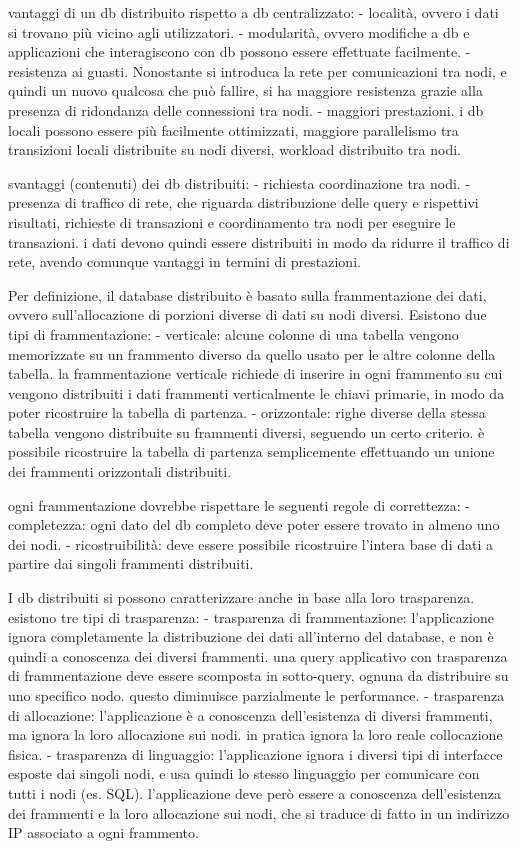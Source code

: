 vantaggi di un db distribuito rispetto a db centralizzato:
- località, ovvero i dati si trovano più vicino agli utilizzatori.
- modularità, ovvero modifiche a db e applicazioni che interagiscono con db
possono essere effettuate facilmente.
- resistenza ai guasti. Nonostante si introduca la rete per comunicazioni tra
nodi, e quindi un nuovo qualcosa che può fallire, si ha maggiore resistenza
grazie alla presenza di ridondanza delle connessioni tra nodi.
- maggiori prestazioni. i db locali possono essere più facilmente ottimizzati,
maggiore parallelismo tra transizioni locali distribuite su nodi diversi, workload
distribuito tra nodi.

svantaggi (contenuti) dei db distribuiti:
- richiesta coordinazione tra nodi.
- presenza di traffico di rete, che riguarda distribuzione delle query e
rispettivi risultati, richieste di transazioni e coordinamento tra nodi
per eseguire le transazioni. i dati devono quindi essere distribuiti in
modo da ridurre il traffico di rete, avendo comunque vantaggi in termini
di prestazioni.


Per definizione, il database distribuito è basato sulla frammentazione dei dati,
ovvero sull'allocazione di porzioni diverse di dati su nodi diversi.
Esistono due tipi di frammentazione:
- verticale: alcune colonne di una tabella vengono memorizzate su un frammento
diverso da quello usato per le altre colonne della tabella.
la frammentazione verticale richiede di inserire in ogni frammento su cui
vengono distribuiti i dati frammenti verticalmente le chiavi primarie, in modo
da poter ricostruire la tabella di partenza.
- orizzontale: righe diverse della stessa tabella vengono distribuite
su frammenti diversi, seguendo un certo criterio. è possibile ricostruire la
tabella di partenza semplicemente effettuando un unione dei frammenti orizzontali
distribuiti.

ogni frammentazione dovrebbe rispettare le seguenti regole di correttezza:
- completezza: ogni dato del db completo deve poter essere trovato in almeno
uno dei nodi.
- ricostruibilità: deve essere possibile ricostruire l'intera base di dati
a partire dai singoli frammenti distribuiti.


I db distribuiti si possono caratterizzare anche in base alla loro trasparenza.
esistono tre tipi di trasparenza:
- trasparenza di frammentazione: l'applicazione ignora completamente la distribuzione
dei dati all'interno del database, e non è quindi a conoscenza dei diversi frammenti.
una query applicativo con trasparenza di frammentazione deve essere scomposta
in sotto-query, ognuna da distribuire su uno specifico nodo. questo diminuisce
parzialmente le performance.
- trasparenza di allocazione: l'applicazione è a conoscenza dell'esistenza di
diversi frammenti, ma ignora la loro allocazione sui nodi. in pratica ignora
la loro reale collocazione fisica.
- trasparenza di linguaggio: l'applicazione ignora i diversi tipi di interfacce
esposte dai singoli nodi, e usa quindi lo stesso linguaggio per comunicare con
tutti i nodi (es. SQL). l'applicazione deve però essere a conoscenza dell'esistenza
dei frammenti e la loro allocazione sui nodi, che si traduce di fatto in un
indirizzo IP associato a ogni frammento.


